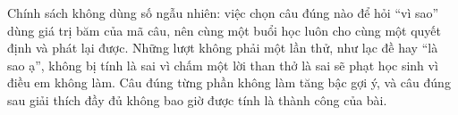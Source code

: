 Chính sách không dùng số ngẫu nhiên: việc chọn câu đúng nào để hỏi ``vì sao'' dùng giá trị băm của mã câu, nên cùng một buổi học luôn cho cùng một quyết định và phát lại được. Những lượt không phải một lần thử, như lạc đề hay ``là sao ạ'', không bị tính là sai vì chấm một lời than thở là sai sẽ phạt học sinh vì điều em không làm. Câu đúng từng phần không làm tăng bậc gợi ý, và câu đúng sau giải thích đầy đủ không bao giờ được tính là thành công của bài.
